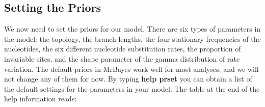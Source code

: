 \documentclass[12pt]{book}
\begin{document}
\subsection{Setting the Priors}

We now need to set the priors for our model. There are six types of parameters in the model: the topology,
 the branch lengths, the four stationary frequencies of the nucleotides, the six different nucleotide
 substitution rates, the proportion of invariable sites, and the shape parameter of the gamma distribution
 of rate variation. The default priors in MrBayes work well for most analyses, and we will not change any
 of them for now. By typing \textbf{help prset} you can obtain a list of the default settings for the
 parameters in your model. The table at the end of the help information reads:
\end{document}
